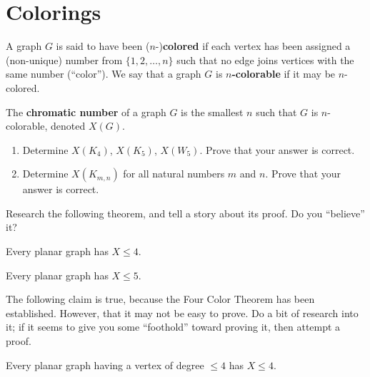 \section{Colorings}\label{sec:colorings}

\begin{definition} A graph $G$ is said to have been ($n$-)\textbf{colored} if each vertex has been assigned a (non-unique) number from $\{1, 2, \ldots, n\}$ such that no edge joins vertices with the same number (``color'').  We say that a graph $G$ is \textbf{$n$-colorable} if it may be $n$-colored.
\end{definition}

\begin{definition} The \textbf{chromatic number} of a graph $G$ is the smallest $n$ such that $G$ is $n$-colorable, denoted $X(G)$.
\end{definition}

\begin{examples}\leavevmode
\begin{enumerate}
    \item Determine $X(K_4)$, $X(K_5)$, $X(W_5)$.  Prove that your answer is correct.
    \item Determine $X(K_{m,n})$ for all natural numbers $m$ and $n$. Prove that your answer is correct.
\end{enumerate}
\end{examples}

\begin{exercise} Research the following theorem, and tell a story about its proof.  Do you ``believe'' it?
\end{exercise}

\begin{theorem} Every planar graph has $X \leq 4$.
\end{theorem}

\begin{theorem} Every planar graph has $X \leq 5$.
\end{theorem}

\begin{remark} The following claim is true, because the Four Color Theorem has been established.  However, that it may not be easy to prove.  Do a bit of research into it; if it seems to give you some ``foothold'' toward proving it, then attempt a proof.
\end{remark}

\begin{claim} Every planar graph having a vertex of degree $\leq 4$ has $X\leq 4$.
\end{claim}

